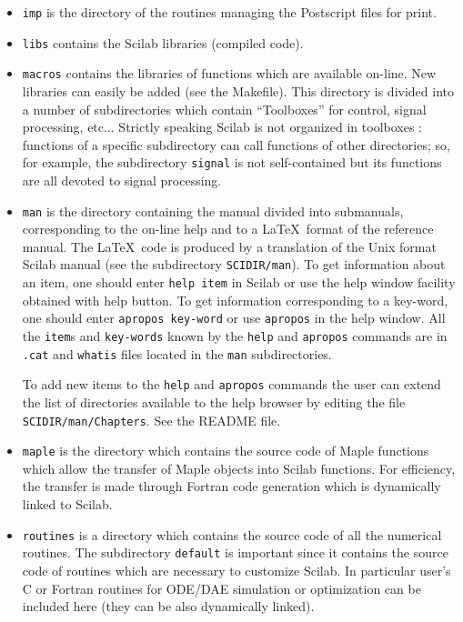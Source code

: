 \begin{itemize}
\item{{\tt imp} is the directory of the routines managing the Postscript files
for print.}

\item{{\tt libs} contains the Scilab libraries (compiled code).}

\item{{\tt macros} contains the libraries of functions
which are available on-line. New libraries can easily be added 
(see the Makefile). This directory is divided into a number of subdirectories
which contain ``Toolboxes'' for control, signal processing, etc... Strictly
speaking Scilab is not organized in toolboxes : functions of a specific
subdirectory can call functions of other directories; so, for example, the 
subdirectory {\tt signal} is not self-contained but its functions are all devoted
to signal processing.}

\item{{\tt man} is the directory containing the manual divided 
into submanuals, corresponding to the on-line help and to 
a \LaTeX\  format of the reference manual. 
The \LaTeX\  code is produced by a 
translation of the Unix format Scilab manual (see the subdirectory
{\tt SCIDIR/man}).}
To get information about an item, one should enter 
{\tt help item} 
in Scilab or use the help window facility obtained with help button.
To get information corresponding to a key-word, one should  enter 
{\tt apropos key-word} or use 
{\tt apropos} in the help window. 
All the {\tt item}s and {\tt key-words} known by the {\tt help} and 
{\tt apropos} commands are in {\tt .cat} and {\tt whatis} files 
located in the {\tt man} subdirectories.

To add new items to the {\verb!help!} and {\tt apropos} commands 
the user can extend the list of directories available to the help 
browser by editing the file {\tt SCIDIR/man/Chapters}. See the README file.

\item{{\tt maple} is the directory which contains the source code of Maple
functions which allow the transfer of Maple objects
into Scilab functions. For efficiency, the transfer
is made through Fortran code generation which is dynamically linked
to Scilab.}

\item{{\tt routines} is a directory which contains the source code of all
the numerical routines. The subdirectory {\tt default} is important
since it contains the
source code of routines which are necessary to customize Scilab.}
In particular user's C or Fortran routines for ODE/DAE simulation 
or optimization can be included here (they can be also dynamically
linked).


\end{itemize}
